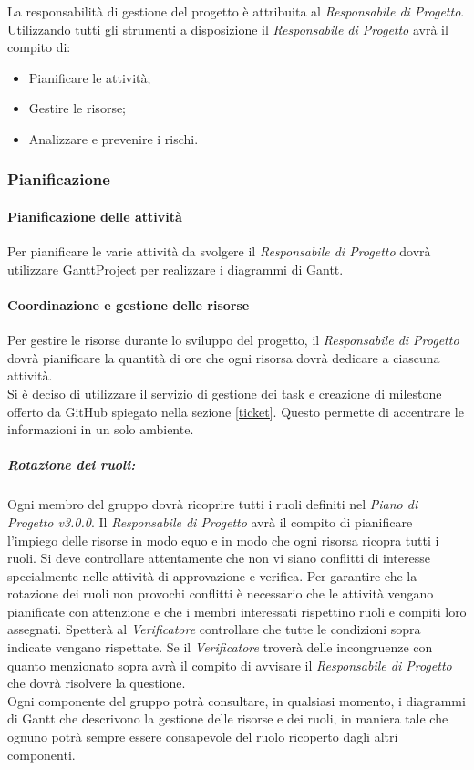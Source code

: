 La responsabilità di gestione del progetto è attribuita al \textit{Responsabile di Progetto}. \\
Utilizzando tutti gli strumenti a disposizione il \textit{Responsabile di Progetto} avrà il compito di:
\begin{itemize}
	\item Pianificare le attività;
	\item Gestire le risorse;
	\item Analizzare e prevenire i rischi.
\end{itemize}

\subsubsection{Pianificazione}

\paragraph{Pianificazione delle attività}
Per pianificare le varie attività da svolgere il \textit{Responsabile di Progetto} dovrà utilizzare \gls{GanttProject} per realizzare i diagrammi di \gls{Gantt}.

\paragraph{Coordinazione e gestione delle risorse}
Per gestire le risorse durante lo sviluppo del progetto, il \textit{Responsabile di Progetto} dovrà pianificare la quantità di ore che ogni risorsa dovrà dedicare a ciascuna attività.\\
Si è deciso di utilizzare il servizio di gestione dei \gls{task} e creazione di \gls{milestone} offerto da \gls{GitHub} spiegato nella sezione \ref{ticket}. Questo permette di accentrare le informazioni in un solo ambiente.
	\subparagraph{Rotazione dei ruoli:}
	Ogni membro del gruppo dovrà ricoprire tutti i ruoli definiti nel \textit{Piano di Progetto v3.0.0}. Il \textit{Responsabile di Progetto} avrà il compito di pianificare l'impiego delle risorse in modo equo e in modo che ogni risorsa ricopra tutti i ruoli. 
	Si deve controllare attentamente che non vi siano conflitti di interesse specialmente nelle attività di approvazione e verifica. Per garantire che la rotazione dei ruoli non provochi conflitti è necessario che le attività vengano pianificate con attenzione e che i membri interessati rispettino ruoli e compiti loro assegnati. Spetterà al \textit{Verificatore} controllare che tutte le condizioni sopra indicate vengano rispettate. Se il \textit{Verificatore} troverà delle incongruenze con quanto menzionato sopra avrà il compito di avvisare il \textit{Responsabile di Progetto} che dovrà risolvere la questione.\\
	Ogni componente del gruppo potrà consultare, in qualsiasi momento, i diagrammi di \gls{Gantt} che descrivono la gestione delle risorse e dei ruoli, in maniera tale che ognuno potrà sempre essere consapevole del ruolo ricoperto dagli altri componenti.

